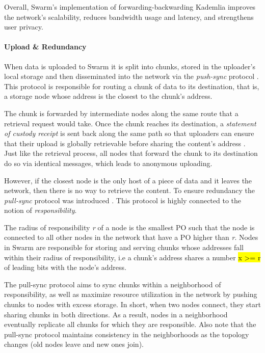 Overall, Swarm's implementation of forwarding-backwarding Kademlia improves the network's scalability, reduces bandwidth usage and latency, and strengthens user privacy.

\paragraph{Upload \& Redundancy}\label{par:upload_swarm}
When data is uploaded to Swarm it is split into chunks, stored in the uploader's local storage and then disseminated into the network via the \textit{push-sync} protocol \citep{swarm_team_2021}. This protocol is responsible for routing a chunk of data to its destination, that is, a storage node whose address is the closest to the chunk's address.

The chunk is forwarded by intermediate nodes along the same route that a retrieval request would take. Once the chunk reaches its destination, a \textit{statement of custody receipt} is sent back along the same path so that uploaders can ensure that their upload is globally retrievable before sharing the content's address \citep[p.~47]{tron_2020}. Just like the retrieval process, all nodes that forward the chunk to its destination do so via identical messages, which leads to anonymous uploading.

However, if the closest node is the only host of a piece of data and it leaves the network, then there is no way to retrieve the content. To ensure redundancy the \textit{pull-sync} protocol was introduced \citep{swarm_team_2021}. This protocol is highly connected to the notion of \textit{responsibility}.

The radius of responsibility \textit{r} of a node is the smallest PO such that the node is connected to all other nodes in the network that have a PO higher than \textit{r}. Nodes in Swarm are responsible for storing and serving chunks whose addresses fall within their radius of responsibility, i.e a chunk's address shares a number \hl{x >= r} of leading bits with the node's address.

The pull-sync protocol aims to sync chunks within a neighborhood of responsibility, as well as maximize resource utilization in the network by pushing chunks to nodes with excess storage. In short, when two nodes connect, they start sharing chunks in both directions. As a result, nodes in a neighborhood eventually replicate all chunks for which they are responsible. Also note that the pull-sync protocol maintains consistency in the neighborhoods as the topology changes (old nodes leave and new ones join).

